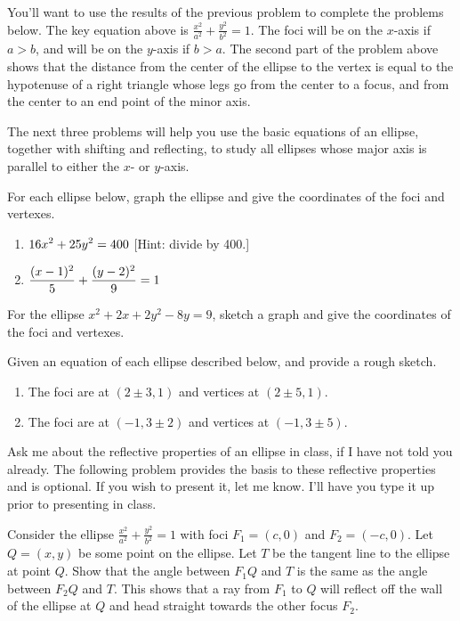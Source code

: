 You'll want to use the results of the previous problem to complete the problems below. The key equation above is $\frac{x^2}{a^2}+\frac{y^2}{b^2}=1$. The foci will be on the $x$-axis if $a>b$, and will be on the $y$-axis if $b>a$. The second part of the problem above shows that the distance from the center of the ellipse to the vertex is equal to the hypotenuse of a right triangle whose legs go from the center to a focus, and from the center to an end point of the minor axis. 

The next three problems will help you use the basic equations of an ellipse, together with shifting and reflecting, to study all ellipses whose major axis is parallel to either the $x$- or $y$-axis. 

\begin{problem}  
For each ellipse below, graph the ellipse and give the coordinates of the foci and vertexes. \begin{enumerate}
\item $\displaystyle 16x^2+25y^2=400$ [Hint: divide by 400.]
\item $\displaystyle \frac{(x-1)^2}{5}+\frac{(y-2)^2}{9}=1$
\end{enumerate}
\end{problem}

\begin{problem}
For the ellipse $x^2+2x+2y^2-8y=9$, sketch a graph and give the coordinates of the foci and vertexes. 
\end{problem}

\begin{problem} 
Given an equation of each ellipse described below, and provide a rough sketch.
\begin{enumerate}
\item The foci are at $(2\pm 3,1)$ and vertices at $(2\pm 5, 1)$.
\item The foci are at $(-1,3\pm 2)$ and vertices at $(-1, 3\pm 5)$.
\end{enumerate}
\end{problem}

Ask me about the reflective properties of an ellipse in class, if I have not told you already. The following problem provides the basis to these reflective properties and is optional.  If you wish to present it, let me know. I'll have you type it up prior to presenting in class.

\begin{problem*}[Optional]
Consider the ellipse $\frac{x^2}{a^2}+\frac{y^2}{b^2}=1$ with foci $F_1=(c,0)$ and $F_2=(-c,0)$. 
Let $Q=(x,y)$ be some point on the ellipse. 
Let $T$ be the tangent line to the ellipse at point $Q$. 
Show that the angle between $F_1Q$ and $T$ is the same as the angle between $F_2Q$ and $T$. This shows that a ray from $F_1$ to $Q$ will reflect off the wall of the ellipse at $Q$ and head straight towards the other focus $F_2$.
\end{problem*}


